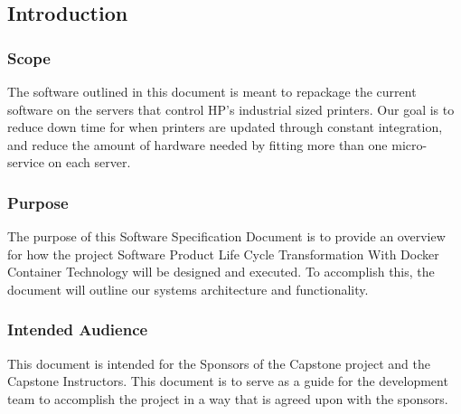 \documentclass[onecolumn, draftclsnofoot,10pt, compsoc]{IEEEtran}
\begin{document}
\subsection{Introduction}

\subsubsection{Scope}

The software outlined in this document is meant to repackage the current software on the servers that control HP’s industrial sized printers.
Our goal is to reduce down time for when printers are updated through constant integration, and reduce the amount of hardware needed by fitting more than one micro-service on each server.


\subsubsection{Purpose}

The purpose of this Software Specification Document is to provide an overview for how the project Software Product Life Cycle Transformation With Docker Container Technology will be designed and executed.
To accomplish this, the document will outline our systems architecture and functionality.


\subsubsection{Intended Audience}

This document is intended for the Sponsors of the Capstone project and the Capstone Instructors.
This document is to serve as a guide for the development team to accomplish the project in a way that is agreed upon with the sponsors.
\end{document}
